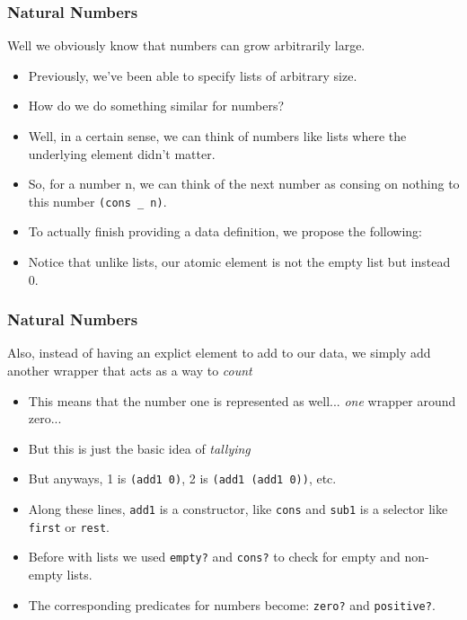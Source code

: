 \documentclass{beamer}
\begin{document}
\begin{frame}
  \frametitle{Natural Numbers}
  Well we obviously know that numbers can grow arbitrarily large.
  \begin{itemize}
  \item<2-> Previously, we've been able to specify lists of arbitrary size.
  \item<3-> How do we do something similar for numbers?
  \item<4-> Well, in a certain sense, we can think of numbers like
    lists where the underlying element didn't matter.
  \item<5-> So, for a number n, we can think of the next number
    as consing on nothing to this number \texttt{(cons _ n)}.
  \item<6-> To actually finish providing a data definition,
    we propose the following:
    \natDef
  \item<7-> Notice that unlike lists, our atomic element is not
    the empty list but instead 0.
  \end{itemize}
\end{frame}

\begin{frame}
  \frametitle{Natural Numbers}
  Also, instead of having an explict element to add to our data, we simply add another wrapper that acts as a way to \emph{count}
  \begin{itemize}
  \item<2-> This means that the number one is represented as well...
    \emph{one} wrapper around zero...
  \item<3-> But this is just the basic idea of \emph{tallying}
  \item<4-> But anyways, 1 is \texttt{(add1 0)},
    2 is \texttt{(add1 (add1 0))}, etc.
  \item<5-> Along these lines, \texttt{add1} is a constructor, like
    \texttt{cons} and \texttt{sub1} is a selector like \texttt{first} or \texttt{rest}.
  \item<6-> Before with lists we used \texttt{empty?} and \texttt{cons?} to check for empty and non-empty lists.
  \item<7-> The corresponding predicates for numbers become: \texttt{zero?} and \texttt{positive?}.
  \end{itemize}
\end{frame}
\end{document}
